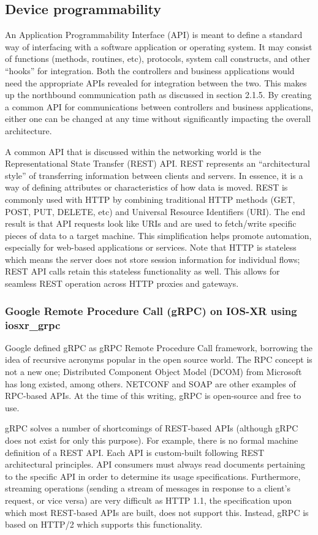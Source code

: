\subsection{Device programmability}
An Application Programmability Interface (API) is meant to define a standard
way of interfacing with a software application or operating system. It may
consist of functions (methods, routines, etc), protocols, system call
constructs, and other ``hooks'' for integration. Both the controllers and
business applications would need the appropriate APIs revealed for integration
between the two. This makes up the northbound communication path as discussed
in section 2.1.5. By creating a common API for communications between
controllers and business applications, either one can be changed at any time
without significantly impacting the overall architecture.

A common API that is discussed within the networking world is the
Representational State Transfer (REST) API\@. REST represents an ``architectural
style'' of transferring information between clients and servers. In essence, it
is a way of defining attributes or characteristics of how data is moved. REST
is commonly used with HTTP by combining traditional HTTP methods (GET, POST,
PUT, DELETE, etc) and Universal Resource Identifiers (URI). The end result is
that API requests look like URIs and are used to fetch/write specific pieces
of data to a target machine. This simplification helps promote automation,
especially for web-based applications or services. Note that HTTP is stateless
which means the server does not store session information for individual
flows; REST API calls retain this stateless functionality as well. This allows
for seamless REST operation across HTTP proxies and gateways.

\subsubsection{Google Remote Procedure Call (gRPC) on IOS-XR using iosxr\_grpc}
Google defined gRPC as gRPC Remote Procedure Call framework, borrowing the
idea of recursive acronyms popular in the open source world. The RPC concept
is not a new one; Distributed Component Object Model (DCOM) from Microsoft has
long existed, among others. NETCONF and SOAP are other examples of RPC-based
APIs. At the time of this writing, gRPC is open-source and free to use.

gRPC solves a number of shortcomings of REST-based APIs (although gRPC does
not exist for only this purpose). For example, there is no formal machine
definition of a REST API\@. Each API is custom-built following REST
architectural principles. API consumers must always read documents pertaining
to the specific API in order to determine its usage specifications.
Furthermore, streaming operations (sending a stream of messages in response to
a client's request, or vice versa) are very difficult as HTTP 1.1, the
specification upon which most REST-based APIs are built, does not support
this. Instead, gRPC is based on HTTP/2 which supports this functionality.

